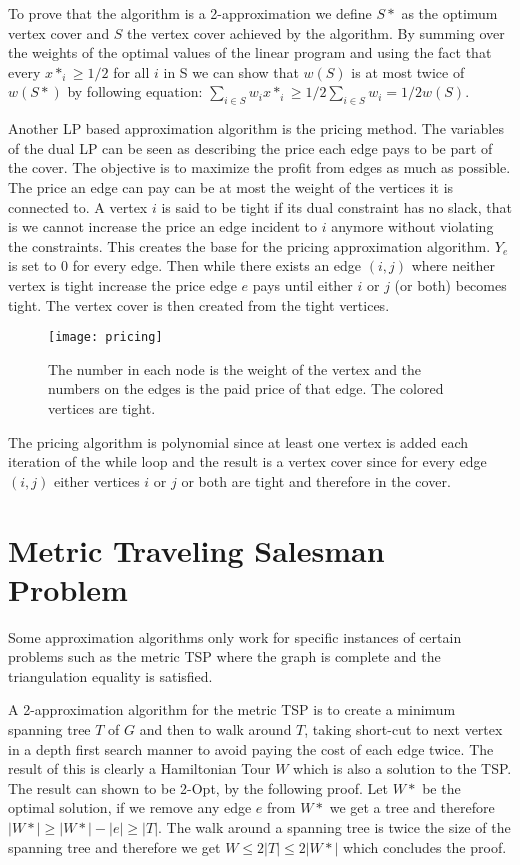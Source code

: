 To prove that the algorithm is a 2-approximation we define $S*$ as the optimum vertex cover and $S$ the vertex cover achieved by the algorithm. By summing over the weights of the optimal values of the linear program and using the fact that every $x*_i \ge 1/2$ for all $i$ in S we can show that $w(S)$ is at most twice of $w(S*)$ by following equation: $\sum_{i \in S} w_i x*_i \ge 1/2 \sum_{i \in S} w_i = 1/2 w(S)$.

Another LP based approximation algorithm is the pricing method. The variables of the dual LP can be seen as describing the price each edge pays to be part of the cover. The objective is to maximize the profit from edges as much as possible. The price an edge can pay can be at most the weight of the vertices it is connected to. A vertex $i$ is said to be tight if its dual constraint has no slack, that is we cannot increase the price an edge incident to $i$ anymore without violating the constraints. This creates the base for the pricing approximation algorithm. $Y_e$ is set to 0 for every edge. Then while there exists an edge $(i,j)$ where neither vertex is tight increase the price edge $e$ pays until either $i$ or $j$ (or both) becomes tight. The vertex cover is then created from the tight vertices.

\begin{figure}[H]
    \centering
    \texttt{[image: pricing]}
    \caption{The number in each node is the weight of the vertex and the numbers on the edges is the paid price of that edge. The colored vertices are tight.}
\end{figure}

\newpar The pricing algorithm is polynomial since at least one vertex is added each iteration of the while loop and the result is a vertex cover since for every edge $(i,j)$ either vertices $i$ or $j$ or both are tight and therefore in the cover. 

\section{Metric Traveling Salesman Problem}
Some approximation algorithms only work for specific instances of certain problems such as the metric TSP where the graph is complete and the triangulation equality is satisfied. 

A 2-approximation algorithm for the metric TSP is to create a minimum spanning tree $T$ of $G$ and then to walk around $T$, taking short-cut to next vertex in a depth first search manner to avoid paying the cost of each edge twice. The result of this is clearly a Hamiltonian Tour $W$ which is also a solution to the TSP. The result can shown to be 2-Opt, by the following proof. Let $W*$ be the optimal solution, if we remove any edge $e$ from $W*$ we get a tree and therefore $|W*| \ge |W*| - |e| \ge |T|$. The walk around a spanning tree is twice the size of the spanning tree and therefore we get $W \le 2|T| \le 2|W*|$ which concludes the proof.
 
